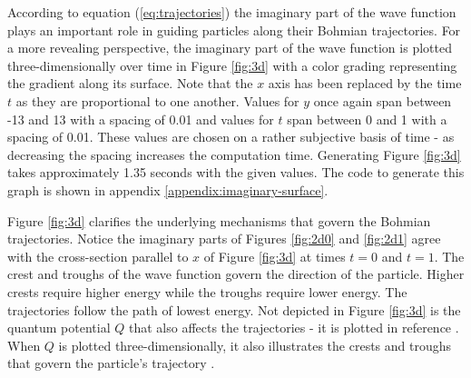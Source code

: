 \documentclass[10pt, reqno]{article}
\begin{document}
  According to equation (\ref{eq:trajectories}) the imaginary part of the wave function plays an important role in guiding particles along their 
    Bohmian trajectories.
  For a more revealing perspective, the imaginary part of the wave function is plotted three-dimensionally over time in Figure \ref{fig:3d}
    with a color grading representing the gradient along its surface.
  Note that the $x$ axis has been replaced by the time $t$ as they are proportional to one another.
  Values for $y$ once again span between -13 and 13 with a spacing of 0.01 and
    values for $t$ span between 0 and 1 with a spacing of 0.01.
  These values are chosen on a rather subjective basis of time - as decreasing the spacing increases the computation time.
  Generating Figure \ref{fig:3d} takes approximately 1.35 seconds with the given values.
  The code to generate this graph is shown in appendix \ref{appendix:imaginary-surface}.

  Figure \ref{fig:3d} clarifies the underlying mechanisms that govern the Bohmian trajectories.
  Notice the imaginary parts of Figures \ref{fig:2d0} and \ref{fig:2d1} agree with the cross-section parallel to $x$ of Figure \ref{fig:3d} at times $t=0$ and $t=1$.
  The crest and troughs of the wave function govern the direction of the particle. 
  Higher crests require higher energy while the troughs require lower energy.
  The trajectories follow the path of lowest energy.
  Not depicted in Figure \ref{fig:3d} is the quantum potential $Q$ that also affects the trajectories - it is plotted in reference \cite{bohm}. 
  When $Q$ is plotted three-dimensionally, it also illustrates the crests and troughs that govern the particle's trajectory \cite{bohm}.
\end{document}
